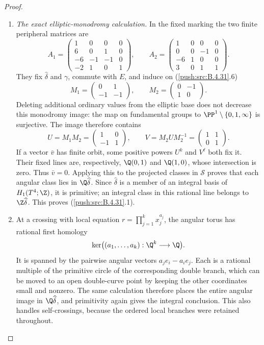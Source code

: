 \begin{proof}
\begin{enumerate}[label=\arabic*.,leftmargin=*]
\item \emph{The exact elliptic-monodromy calculation.}
In the fixed marking the two finite peripheral
matrices are
\[
 A_1=\begin{pmatrix}
 1&0&0&0\\6&0&1&0\\-6&-1&-1&0\\-2&1&0&1
 \end{pmatrix},\qquad
 A_2=\begin{pmatrix}
 1&0&0&0\\0&0&-1&0\\-6&1&0&0\\3&0&1&1
 \end{pmatrix}.
 \tag{B.4.31.7}
\]
They fix $\widehat\delta$ and $\gamma$, commute with $E$,
and induce on (\ref{push:src:B.4.31}.6)
\[
 M_1=\begin{pmatrix}0&1\\-1&-1\end{pmatrix},\qquad
 M_2=\begin{pmatrix}0&-1\\1&0\end{pmatrix}.
\]
Deleting additional ordinary values from the elliptic base
does not decrease this monodromy image: the map on fundamental
groups to $\PP^1\setminus\{0,1,\infty\}$ is surjective.
The image therefore contains
\[
 U=M_1M_2=\begin{pmatrix}1&0\\-1&1\end{pmatrix},\qquad
 V=M_2UM_2^{-1}=\begin{pmatrix}1&1\\0&1\end{pmatrix}.
 \tag{B.4.31.8}
\]
If a vector $\bar v$ has finite orbit, some positive powers
$U^k$ and $V^\ell$ both fix it. Their fixed lines are,
respectively, $\Q(0,1)$ and $\Q(1,0)$, whose intersection
is zero. Thus $\bar v=0$. Applying this to the projected
classes in $\mathscr S$ proves that each angular class lies
in $\Q\widehat\delta$. Since $\widehat\delta$ is a member
of an integral basis of $H_1(T^4;\Z)$, it is primitive;
an integral class in this rational line belongs to
$\Z\widehat\delta$. This proves (\ref{push:src:B.4.31}.1).

\item At a crossing with local equation
$r=\prod_{j=1}^k x_j^{a_j}$, the angular torus has
rational first homology
\[
 \ker\bigl((a_1,\ldots,a_k):\Q^k\longrightarrow\Q\bigr).
\]
It is spanned by the pairwise angular vectors
$a_j e_i-a_i e_j$. Each is a rational multiple of the
primitive circle of the corresponding double branch,
which can be moved to an open double-curve point by
keeping the other coordinates small and nonzero.
The same calculation therefore places the entire angular
image in $\Q\widehat\delta$, and primitivity again gives
the integral conclusion. This also handles self-crossings,
because the ordered local branches were retained throughout.
\end{enumerate}
\end{proof}


